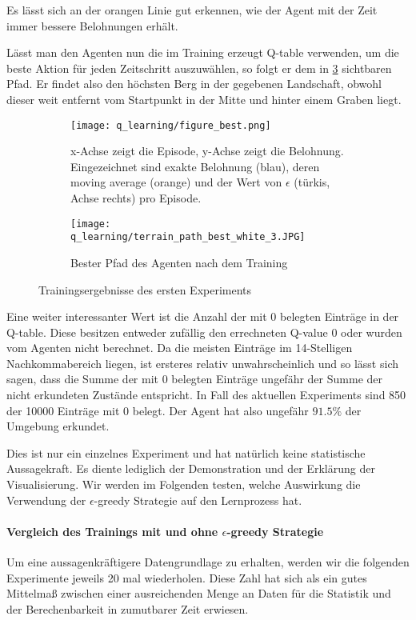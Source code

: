 Es lässt sich an der orangen Linie gut erkennen, wie der Agent mit der Zeit immer bessere Belohnungen erhält.

Lässt man den Agenten nun die im Training erzeugt Q-table verwenden, um die beste Aktion für jeden Zeitschritt auszuwählen, so folgt er dem in \ref{img:pathQBest} sichtbaren Pfad. Er findet also den höchsten Berg in der gegebenen Landschaft, obwohl dieser weit entfernt vom Startpunkt in der Mitte und hinter einem Graben liegt.

\begin{figure}[H]
    \centering
    \begin{subfigure}[b]{0.49\textwidth}
        \texttt{[image: q\_learning/figure\_best.png]}
        \caption{x-Achse zeigt die Episode, y-Achse zeigt die Belohnung. Eingezeichnet sind exakte Belohnung (blau), deren moving average (orange) und der Wert von $ \epsilon $ (türkis, Achse rechts) pro Episode.}
        \label{img:graphQBest}
    \end{subfigure}
    \begin{subfigure}[b]{0.49\textwidth}
        \texttt{[image: q\_learning/terrain\_path\_best\_white\_3.JPG]}
        \caption{Bester Pfad des Agenten nach dem Training}
        \label{img:pathQBest}
    \end{subfigure}
    \caption{Trainingsergebnisse des ersten Experiments}
\end{figure}

Eine weiter interessanter Wert ist die Anzahl der mit 0 belegten Einträge in der Q-table. Diese besitzen entweder zufällig den errechneten Q-value 0 oder wurden vom Agenten nicht berechnet. Da die meisten Einträge im 14-Stelligen Nachkommabereich liegen, ist ersteres relativ unwahrscheinlich und so lässt sich sagen, dass die Summe der mit 0 belegten Einträge ungefähr der Summe der nicht erkundeten Zustände entspricht. In Fall des aktuellen Experiments sind 850 der 10000 Einträge mit 0 belegt. Der Agent hat also ungefähr $ 91.5\% $ der Umgebung erkundet.

Dies ist nur ein einzelnes Experiment und hat natürlich keine statistische Aussagekraft. Es diente lediglich der Demonstration und der Erklärung der Visualisierung. Wir werden im Folgenden testen, welche Auswirkung die Verwendung der $ \epsilon $-greedy Strategie auf den Lernprozess hat.

\paragraph{Vergleich des Trainings mit und ohne $ \epsilon $-greedy Strategie}
Um eine aussagenkräftigere Datengrundlage zu erhalten, werden wir die folgenden Experimente jeweils 20 mal wiederholen. Diese Zahl hat sich als ein gutes Mittelmaß zwischen einer ausreichenden Menge an Daten für die Statistik und der Berechenbarkeit in zumutbarer Zeit erwiesen.


